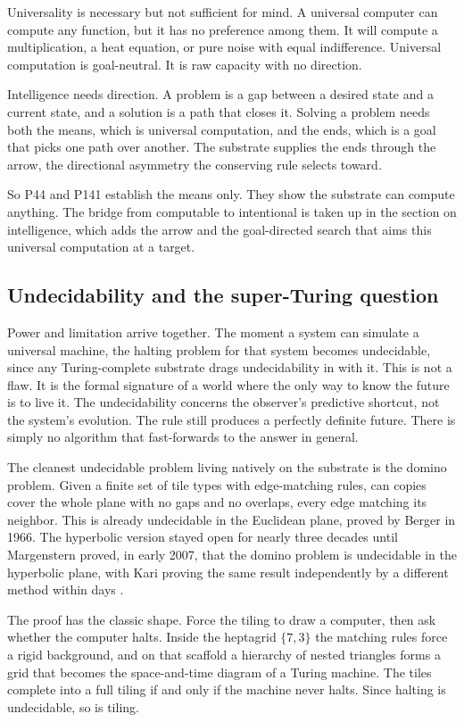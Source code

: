 Universality is necessary but not sufficient for mind. A universal computer can compute any function, but
it has no preference among them. It will compute a multiplication, a heat equation, or pure noise with
equal indifference. Universal computation is goal-neutral. It is raw capacity with no direction.

Intelligence needs direction. A problem is a gap between a desired state and a current state, and a
solution is a path that closes it. Solving a problem needs both the means, which is universal computation,
and the ends, which is a goal that picks one path over another. The substrate supplies the ends through the
arrow, the directional asymmetry the conserving rule selects toward.

So P44 and P141 establish the means
only. They show the substrate can compute anything. The bridge from computable to intentional is taken up
in the section on intelligence, which adds the arrow and the goal-directed search that aims this universal
computation at a target.

\subsection{Undecidability and the super-Turing question}

Power and limitation arrive together. The moment a system can simulate a universal machine, the halting
problem for that system becomes undecidable, since any Turing-complete substrate drags undecidability in
with it. This is not a flaw. It is the formal signature of a world where the only way to know the future is
to live it. The undecidability concerns the observer's predictive shortcut, not the system's evolution. The
rule still produces a perfectly definite future. There is simply no algorithm that fast-forwards to the
answer in general.

The cleanest undecidable problem living natively on the substrate is the domino problem. Given a finite set
of tile types with edge-matching rules, can copies cover the whole plane with no gaps and no overlaps,
every edge matching its neighbor. This is already undecidable in the Euclidean plane, proved by Berger in
1966. The hyperbolic version stayed open for nearly three decades until Margenstern proved, in early 2007,
that the domino problem is undecidable in the hyperbolic plane, with Kari proving the same result
independently by a different method within days \cite{margenstern2013}.

The proof has the classic shape.
Force the tiling to draw a computer, then ask whether the computer halts. Inside the heptagrid $\{7,3\}$
the matching rules force a rigid background, and on that scaffold a hierarchy of nested triangles forms a
grid that becomes the space-and-time diagram of a Turing machine. The tiles complete into a full tiling if
and only if the machine never halts. Since halting is undecidable, so is tiling.

